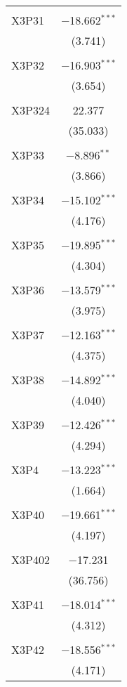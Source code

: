 \begin{table}[!htbp]
\begin{tabular}{@{\extracolsep{5pt}}lc}
  & \\ 
 X3P31 & $-$18.662$^{***}$ \\ 
  & (3.741) \\ 
  & \\ 
 X3P32 & $-$16.903$^{***}$ \\ 
  & (3.654) \\ 
  & \\ 
 X3P324 & 22.377 \\ 
  & (35.033) \\ 
  & \\ 
 X3P33 & $-$8.896$^{**}$ \\ 
  & (3.866) \\ 
  & \\ 
 X3P34 & $-$15.102$^{***}$ \\ 
  & (4.176) \\ 
  & \\ 
 X3P35 & $-$19.895$^{***}$ \\ 
  & (4.304) \\ 
  & \\ 
 X3P36 & $-$13.579$^{***}$ \\ 
  & (3.975) \\ 
  & \\ 
 X3P37 & $-$12.163$^{***}$ \\ 
  & (4.375) \\ 
  & \\ 
 X3P38 & $-$14.892$^{***}$ \\ 
  & (4.040) \\ 
  & \\ 
 X3P39 & $-$12.426$^{***}$ \\ 
  & (4.294) \\ 
  & \\ 
 X3P4 & $-$13.223$^{***}$ \\ 
  & (1.664) \\ 
  & \\ 
 X3P40 & $-$19.661$^{***}$ \\ 
  & (4.197) \\ 
  & \\ 
 X3P402 & $-$17.231 \\ 
  & (36.756) \\ 
  & \\ 
 X3P41 & $-$18.014$^{***}$ \\ 
  & (4.312) \\ 
  & \\ 
 X3P42 & $-$18.556$^{***}$ \\ 
  & (4.171) \\ 

\end{tabular}
\end{table}
